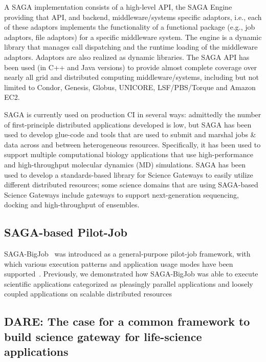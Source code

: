 \documentclass[]{svjour3}
\begin{document}
A SAGA implementation consists of a high-level API, the SAGA
Engine providing that API, and backend, middleware/systems specific
adaptors, i.e., each of these adaptors implements the functionality of
a functional package (e.g., job adaptors, file adaptors) for a
specific middleware system. The engine is a dynamic library that
manages call dispatching and the runtime loading of the middleware
adaptors. Adaptors are also realized as dynamic libraries. The SAGA
API has been used (in C++ and Java versions) to provide almost
complete coverage over nearly all grid and distributed computing
middleware/systems, including but not limited to Condor, Genesis,
Globus, UNICORE, LSF/PBS/Torque and Amazon EC2.

SAGA is currently used on production CI in several ways: admittedly
the number of first-principle distributed applications developed is
low, but SAGA has been used to develop glue-code and tools that are
used to submit and marshal jobs \& data across and between
heterogeneous resources. Specifically, it has been used to support
multiple computational biology applications that use high-performance
and high-throughput molecular dynamics (MD) simulations. SAGA has been
used to develop a standards-based library for Science Gateways to
easily utilize different distributed resources; some science domains
that are using SAGA-based Science Gateways include gateways to support
next-generation sequencing, docking and high-throughput of ensembles.

\subsection{SAGA-based Pilot-Job}

SAGA-BigJob~\cite{saga-ccgrid10} was introduced as a general-purpose
pilot-job framework, with which various execution patterns and
application usage modes have been
supported~\cite{async_repex11,saga-royalsoc}. Previously, we
demonstrated how SAGA-BigJob was able to execute scientific
applications categorized as pleasingly parallel applications and
loosely coupled applications on scalable distributed
resources\cite{jha2009developing, ecmls10, ecmls11}

\subsection{DARE: The case for a common framework to build science
  gateway for life-science applications}

\end{document}
